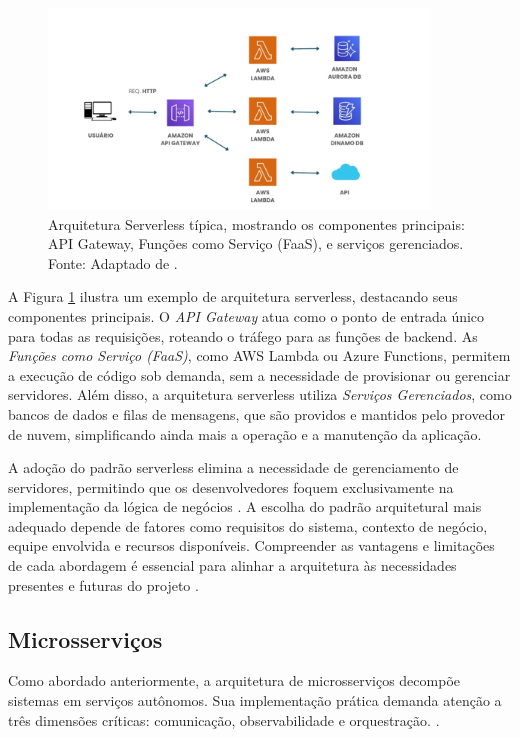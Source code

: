 \begin{figure}[H]
\centering
\includegraphics[width=0.9\textwidth]{images/serverless.png}
\caption{Arquitetura Serverless típica, mostrando os componentes principais: API Gateway, Funções como Serviço (FaaS), e serviços gerenciados. Fonte: Adaptado de \cite{shekhar2023microservices}.}
\label{fig:serverless}
\end{figure}

A Figura \ref{fig:serverless} ilustra um exemplo de arquitetura serverless, destacando seus componentes principais. O \textit{API Gateway} atua como o ponto de entrada único para todas as requisições, roteando o tráfego para as funções de backend. As \textit{Funções como Serviço (FaaS)}, como AWS Lambda ou Azure Functions, permitem a execução de código sob demanda, sem a necessidade de provisionar ou gerenciar servidores. Além disso, a arquitetura serverless utiliza \textit{Serviços Gerenciados}, como bancos de dados e filas de mensagens, que são providos e mantidos pelo provedor de nuvem, simplificando ainda mais a operação e a manutenção da aplicação.

A adoção do padrão serverless elimina a necessidade de gerenciamento de servidores, permitindo que os desenvolvedores foquem exclusivamente na implementação da lógica de negócios \cite{shekhar2023microservices}. A escolha do padrão arquitetural mais adequado depende de fatores como requisitos do sistema, contexto de negócio, equipe envolvida e recursos disponíveis. Compreender as vantagens e limitações de cada abordagem é essencial para alinhar a arquitetura às necessidades presentes e futuras do projeto \cite{jamshidi2016systematic, nizami2020comparison}.

\subsection{Microsserviços}
Como abordado anteriormente, a arquitetura de microsserviços decompõe sistemas em serviços autônomos. Sua implementação prática demanda atenção a três dimensões críticas: comunicação, observabilidade e orquestração. \cite{jamshidi2016systematic, nizami2020comparison}. 

